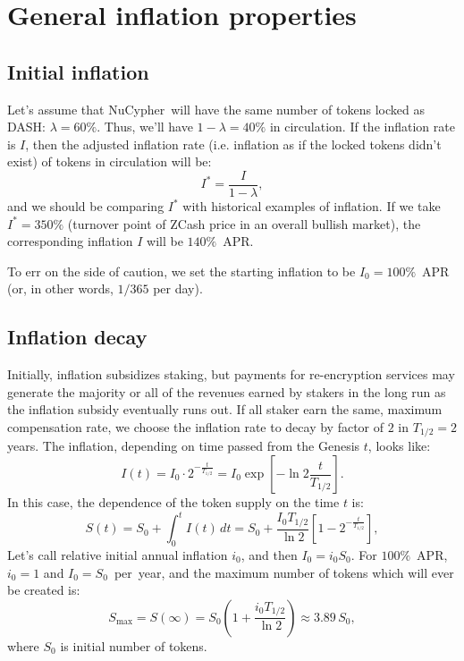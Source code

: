 \documentclass[longbibliography,nofootinbib,twocolumn]{revtex4-1}
\newcommand{\nucypher}{NuCypher}
\begin{document}
\section{General inflation properties}

\subsection{Initial inflation}

Let's assume that \nucypher~will have the same number of tokens locked as DASH: $\lambda=60\%$.
Thus, we'll have $1-\lambda=40\%$ in circulation.
If the inflation rate is $I$, then the adjusted inflation rate (i.e. inflation as if the locked tokens didn't exist) of tokens in circulation will be:
\begin{equation}
    I^* = \frac{I}{1-\lambda},
\end{equation}
and we should be comparing $I^*$ with historical examples of inflation.
If we take $I^*=350\%$ (turnover point of ZCash price in an overall bullish market), the corresponding inflation $I$ will be $140\%$~APR.

To err on the side of caution, we set the starting inflation to be $I_0=100\%$~APR (or, in other words, $1/365$ per day).

\subsection{Inflation decay}

Initially, inflation subsidizes staking, but payments for re-encryption services may generate the majority or all of the revenues earned by stakers in the long run as the inflation subsidy eventually runs out.
If all staker earn the same, maximum compensation rate, we choose the inflation rate to decay by factor of $2$ in $T_{1/2} = 2$ years.
The inflation, depending on time passed from the Genesis $t$, looks like:
\begin{equation}
    I(t) = I_0 \cdot 2^{-\frac{t}{T_{1/2}}} = I_0 \exp\left[ -\ln{2} \frac{t}{T_{1/2}} \right].
\end{equation}
In this case, the dependence of the token supply on the time $t$ is:
\begin{equation}
    \label{eq:supply-time}
    S(t) = S_0 + \int_0^{t} I(t)\, dt = S_0 + \frac{I_0 T_{1/2}}{\ln{2}}\left[1 - 2^{-\frac{t}{T_{1/2}}} \right],
\end{equation}
Let's call relative initial annual inflation $i_0$, and then $I_0 = i_0 S_0$.
For $100\%$~APR, $i_0=1$ and $I_0=S_0$~per~year, and the maximum number of tokens which will ever be created is:
\begin{equation}
    S_{\max} = S(\infty) = S_0\left(1 + \frac{i_0 T_{1/2}}{\ln{2}}\right) \approx 3.89\, S_0,
\end{equation}
where $S_0$ is initial number of tokens.
\end{document}
